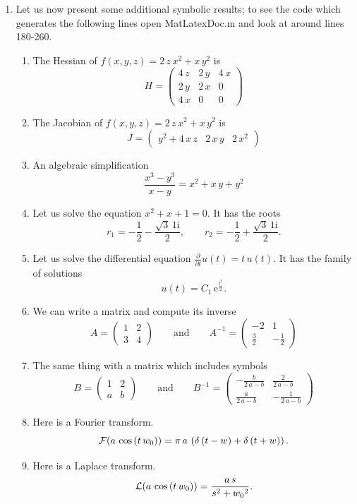 \documentclass{article}
\begin{document}
\begin{enumerate}
  \item Let us now present  some additional symbolic results; to see the code which 
  generates the following lines open \textsf{MatLatexDoc.m} and look at around lines 180-260. 
  \begin{enumerate} 
  \item The Hessian of \(f(x,y,z)=2\,z\,x^2+x\,y^2\) is 
  \[ 
  H=\left(\begin{array}{ccc} 4\,z & 2\,y & 4\,x\\ 2\,y & 2\,x & 0\\ 4\,x & 0 & 0 \end{array}\right) 
  \] 
  \item The Jacobian of \(f(x,y,z)=2\,z\,x^2+x\,y^2\) is 
  \[ 
  J=\left(\begin{array}{ccc} y^2+4\,x\,z & 2\,x\,y & 2\,x^2 \end{array}\right) 
  \] 
  \item An algebraic simplification 
  \[ 
  \frac{x^3-y^3}{x-y}=x^2+x\,y+y^2 
  \] 
  \item Let us solve the equation \(x^2+x+1=0\). It has the roots 
  \[ 
  r_1=-\frac{1}{2}-\frac{\sqrt{3}\,1{}\mathrm{i}}{2}, \qquad r_2=-\frac{1}{2}+\frac{\sqrt{3}\,1{}\mathrm{i}}{2}.  
  \] 
  \item Let us solve the differential equation \(\frac{\partial }{\partial t} u\left(t\right)=t\,u\left(t\right)\). It has the family of solutions 
  \[ 
  u(t)=C_{1}\,{\mathrm{e}}^{\frac{t^2}{2}}.  
  \] 
  \item We can write a matrix and compute its inverse 
  \[ 
  A=\left(\begin{array}{cc} 1 & 2\\ 3 & 4 \end{array}\right) \qquad \text{and} \qquad A^{-1}=\left(\begin{array}{cc} -2 & 1\\ \frac{3}{2} & -\frac{1}{2} \end{array}\right) 
  \] 
  \item The same thing with a matrix which includes symbols 
  \[ 
  B=\left(\begin{array}{cc} 1 & 2\\ a & b \end{array}\right) \qquad \text{and} \qquad B^{-1}=\left(\begin{array}{cc} -\frac{b}{2\,a-b} & \frac{2}{2\,a-b}\\ \frac{a}{2\,a-b} & -\frac{1}{2\,a-b} \end{array}\right) 
  \] 
  \item Here is a Fourier transform. 
  \[ 
  {\cal F}(a\,\cos\left(t\,w_{0}\right))=\pi \,a\,\left(\delta \left(t-w\right)+\delta \left(t+w\right)\right). 
  \] 
  \item Here is a Laplace transform. 
  \[ 
  {\cal L}(a\,\cos\left(t\,w_{0}\right))=\frac{a\,s}{s^2+{w_{0}}^2}. 
  \] 
  \end{enumerate} 
  \bigskip 
   

\end{enumerate}
\end{document}
